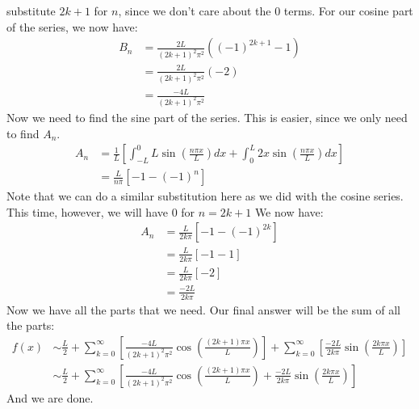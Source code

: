 substitute $2k+1$ for $n$, since we don't care about the $0$ terms. For our
cosine part of the series, we now have:
\begin{align*}
B_{n} &= \frac{2L}{(2k+1)^{2}\pi^{2}}((-1)^{2k+1}-1)\\
&= \frac{2L}{(2k+1)^{2}\pi^{2}}(-2)\\
&= \frac{-4L}{(2k+1)^{2}\pi^{2}}
\end{align*}
\noindent Now we need to find the sine part of the series. This is easier,
since we only need to find $A_{n}$.
\begin{align*}
A_{n} &= \frac{1}{L}\left[\int_{-L}^{0}L\sin{\left(\frac{n\pi x}{L}\right)}dx +
\int_{0}^{L}2x\sin{\left(\frac{n\pi x}{L}\right)}dx \right]\\
&= \frac{L}{n\pi}\left[-1-(-1)^{n}\right]
\end{align*}
\noindent Note that we can do a similar substitution here as we did with the
cosine series. This time, however, we will have $0$ for $n = 2k+1$ We now have:
\begin{align*}
A_{n} &= \frac{L}{2k\pi}\left[-1-(-1)^{2k}\right]\\
&= \frac{L}{2k\pi}\left[-1 - 1\right]\\
&= \frac{L}{2k\pi}\left[-2\right]\\
&= \frac{-2L}{2k\pi}
\end{align*}
\noindent Now we have all the parts that we need. Our final answer will be
the sum of all the parts:
\begin{align*}
f(x)&\sim \frac{L}{2} + \sum_{k = 0}^{\infty}\left[\frac{-4L}{(2k+1)^{2}\pi^{2}}
\cos{\left(\frac{(2k + 1)\pi x}{L}\right)} \right] + \sum_{k =
0}^{\infty}\left[\frac{-2L}{2k\pi}\sin{\left(\frac{2k\pi x}{L}\right)} \right]\\
&\sim \frac{L}{2} + \sum_{k = 0}^{\infty}\left[\frac{-4L}{(2k+1)^{2}\pi^{2}}
\cos{\left(\frac{(2k + 1)\pi x}{L}\right)} + \frac{-2L}{2k\pi}\sin{
\left(\frac{2k\pi x}{L}\right)} \right]
\end{align*}
\noindent And we are done.\\


